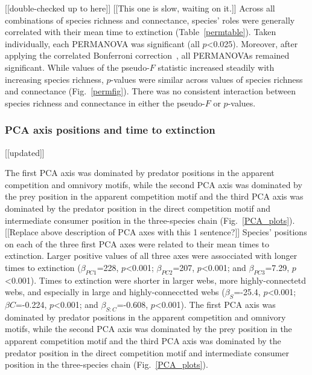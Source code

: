 \documentclass[12pt]{article}
\begin{document}
		[[double-checked up to here]]
		[[This one is slow, waiting on it.]]
		Across all combinations of species richness and connectance, species' roles were generally correlated with their mean time to extinction (Table~\ref{permtable}). Taken individually, each PERMANOVA was significant (all $p$\textless0.025). Moreover, after applying the correlated Bonferroni correction~\citep{Drezner2016}, all PERMANOVAs remained significant. While values of the pseudo-$F$ statistic increased steadily with increasing species richness, $p$-values were similar across values of species richness and connectance (Fig.~\ref{permfig}). There was no consistent interaction between species richness and connectance in either the pseudo-$F$ or $p$-values.


		

		\subsubsection*{PCA axis positions and time to extinction} [[updated]]

			The first PCA axis was dominated by predator positions in the apparent competition and omnivory motifs, while the second PCA axis was dominated by the prey position in the apparent competition motif and the third PCA axis was dominated by the predator position in the direct competition motif and intermediate consumer position in the three-species chain (Fig.~\ref{PCA_plots}).
			[[Replace above description of PCA axes with this 1 sentence?]]	
			Species' positions on each of the three first PCA axes were related to their mean times to extinction. 
			Larger positive values of all three axes were assocciated with longer times to extinction ($\beta_{PC1}$=228, $p$\textless0.001; $\beta_{PC2}$=207, $p$\textless0.001; and $\beta_{PC3}$=7.29, $p$\textless0.001).
			Times to extinction were shorter in larger webs, more highly-connectetd webs, and especially in large and highly-connecctted webs ($\beta_{S}$=-25.4, $p$\textless0.001; $\beta{C}$=-0.224, $p$\textless0.001; and $\beta_{S:C}$=-0.608, $p$\textless0.001).
			The first PCA axis was dominated by predator positions in the apparent competition and omnivory motifs, while the second PCA axis was dominated by the prey position in the apparent competition motif and the third PCA axis was dominated by the predator position in the direct competition motif and intermediate consumer position in the three-species chain (Fig.~\ref{PCA_plots}).
\end{document}
